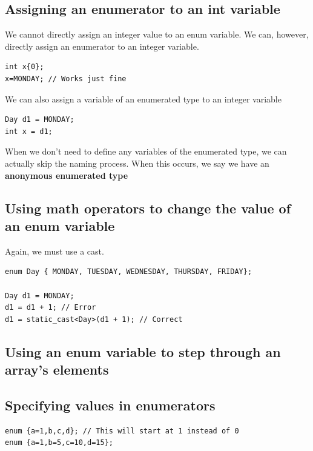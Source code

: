 \documentclass{report}
\begin{document}
    \subsection{Assigning an enumerator to an int variable}
    \bigbreak \noindent 
    We cannot directly assign an integer value to an enum variable. We can, however, directly assign an enumerator to an integer variable.
    \bigbreak \noindent 
    \sepline
    \begin{verbatim}
int x{0};
x=MONDAY; // Works just fine
    \end{verbatim}
    \sepline
    \bigbreak \noindent 
    We can also assign a variable of an enumerated type to an integer variable
    \bigbreak \noindent 
    \sepline
    \begin{verbatim}
Day d1 = MONDAY;
int x = d1;
    \end{verbatim}
    \sepline
    \bigbreak \noindent 
    When we don't need to define any variables of the enumerated type, we can actually skip the naming process. When this occurs, we say we have an \textbf{anonymous enumerated type}
    \bigbreak \noindent 
    \subsection{Using math operators to change the value of an enum variable}
    \bigbreak \noindent 
    Again, we must use a cast.
    \bigbreak \noindent 
    \sepline
    \begin{verbatim}
enum Day { MONDAY, TUESDAY, WEDNESDAY, THURSDAY, FRIDAY};

Day d1 = MONDAY;
d1 = d1 + 1; // Error
d1 = static_cast<Day>(d1 + 1); // Correct
    \end{verbatim}
    \sepline

    \bigbreak \noindent 
    \subsection{Using an enum variable to step through an array's elements}
    \bigbreak \noindent 

    \pagebreak \bigbreak \noindent 
    \subsection{Specifying values in enumerators}
    \bigbreak \noindent 
    \sepline
    \begin{verbatim}
enum {a=1,b,c,d}; // This will start at 1 instead of 0
enum {a=1,b=5,c=10,d=15}; 
    \end{verbatim}
    \sepline
    \bigbreak \noindent 
\end{document}
